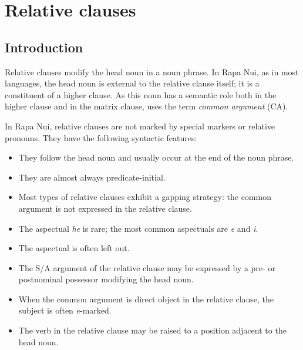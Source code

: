 \section{Relative clauses}\label{sec:11.4}
\subsection{Introduction}\label{sec:11.4.1}

Relative clauses modify the head noun in a noun phrase. In Rapa Nui, as in most languages, the head noun is external to the relative clause itself; it is a constituent of a higher clause. As this noun has a semantic role both in the higher clause and in the matrix clause, \citet[317]{Dixon2010-2} uses the term \textit{common argument} (CA).

In Rapa Nui, relative clauses are not marked by special markers or relative pronouns. They have the following syntactic features:

\begin{itemize}
\item 
They follow the head noun and usually occur at the end of the noun phrase.

\item 
They are almost always predicate-initial.

\item 
Most types of relative clauses exhibit a gapping strategy: the common argument is not expressed in the relative clause.

\item 
The aspectual \textit{he} is rare; the most common aspectuals are \textit{e} and \textit{i}.

\item 
The aspectual is often left out.

\item 
The S/A argument of the relative clause may be expressed by a pre- or postnominal possessor modifying the head noun.

\item 
When the common argument is direct object in the relative clause, the subject is often \textit{e}{}-marked.

\item 
The verb in the relative clause may be raised to a position adjacent to the head noun.

\end{itemize}

